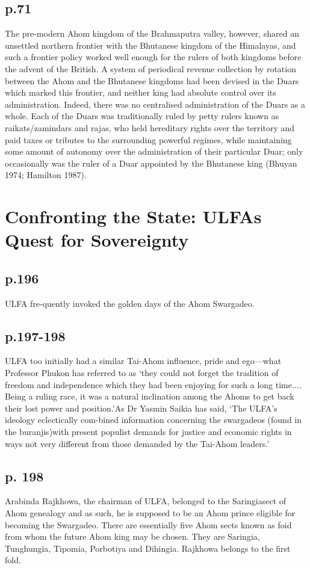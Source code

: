 \documentclass[12pt]{article}
\begin{document}
\subsection{p.71}

The pre-modern Ahom kingdom of the Brahmaputra valley, however, shared
an unsettled northern frontier with the Bhutanese kingdom of the Himalayas, and
such a frontier policy worked well enough for the rulers of both kingdoms
before the advent of the British. A system of periodical revenue collection
by rotation between the Ahom and the Bhutanese kingdoms had been devised in the
Duars which marked this frontier, and neither king had absolute control over its
administration. Indeed, there was no centralised administration of the Duars as
a whole. Each of the Duars was traditionally ruled by petty rulers known as
raikats/zamindars and rajas, who held hereditary rights over the territory and
paid taxes or tributes to the surrounding powerful regimes, while maintaining
some amount of autonomy over the administration of their particular Duar;
only occasionally was the ruler of a Duar appointed by the Bhutanese king
(Bhuyan 1974; Hamilton 1987).

\section{Confronting the State: ULFAs Quest for Sovereignty
\citep{Mahanta_2013}}

\subsection{p.196}

ULFA fre-quently invoked the golden days of the Ahom Swargadeo.

\subsection{p.197-198}

ULFA too initially had a similar Tai-Ahom influence, pride and ego—what
Professor Phukon has referred to as ‘they could not forget the tradition of
freedom and independence which they had been enjoying for such a long
time.... Being a ruling race, it was a natural inclination among the Ahoms to
get back their lost power and position.’As Dr Yasmin Saikia has said, ‘The
ULFA’s ideology eclectically com-bined information concerning the swargadeos
(found in the buranjis)with present populist demands for justice and economic
rights in ways not very different from those demanded by the Tai-Ahom leaders.’

\subsection{p. 198}

Arabinda Rajkhowa, the chairman of ULFA, belonged to the Saringiasect of Ahom
genealogy and as such, he is supposed to be an Ahom prince eligible
for becoming the Swargadeo. There are essentially five Ahom sects
known as foid from whom the future Ahom king may be chosen. They are
Saringia, Tunghungia, Tipomia, Porbotiya and Dihingia. Rajkhowa belongs to the
first fold. \pagebreak



\end{document}
